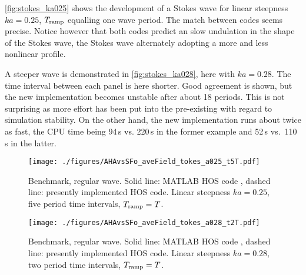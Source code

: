 \documentclass[a4paper,12pt]{article}
\renewcommand{\_}[1]{_\mr{#1}}
\begin{document}
\autoref{fig:stokes_ka025} shows the development of a Stokes wave for linear steepness $ka = 0.25$, $T\_{ramp}$ equalling one wave period.
The match between codes seems precise. 
Notice however that both codes predict an slow undulation in the shape of the Stokes wave, the Stokes wave alternately adopting a more and less nonlinear profile.  

A steeper wave is demonstrated in \autoref{fig:stokes_ka028}, here with $ka = 0.28$. The time interval between each panel is here shorter. Good agreement is shown, but the new implementation becomes unstable after about 18 periods. This is not surprising as more effort has been put into the pre-existing with regard to simulation stability. On the other hand, the new implementation runs about twice as fast, the CPU time being 94\,s vs. 220\,s in the former example and 52\,s vs.\ 110\,s in the latter.

\begin{figure}[h!ptb]%
\centering
\texttt{[image: ./figures/AHAvsSFo\_waveField\_Stokes\_ka025\_dt5T.pdf]}%
\caption{Benchmark, regular wave. Solid line: MATLAB HOS code \citep{SFo2018_HOS}, dashed line: presently implemented HOS code.
Linear steepness $ka = 0.25$, five period time intervals, $T\_{ramp}=T$.
}%
\label{fig:stokes_ka025}%
\end{figure}
\begin{figure}[h!ptb]%
\centering
\texttt{[image: ./figures/AHAvsSFo\_waveField\_Stokes\_ka028\_dt2T.pdf]}%
\caption{Benchmark, regular wave. Solid line: MATLAB HOS code \citep{SFo2018_HOS}, dashed line: presently implemented HOS code.
Linear steepness $ka = 0.28$, two period time intervals, $T\_{ramp}=T$.
}%
\label{fig:stokes_ka028}%
\end{figure}
\end{document}
